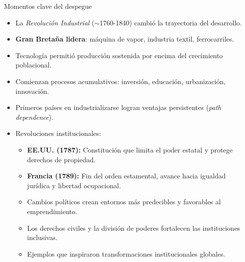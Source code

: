 \documentclass{beamer}
\begin{document}
\begin{frame}{Momentos clave del despegue}
    \small
    \begin{itemize}
        \item La \textit{Revolución Industrial} ($\sim$1760-1840) cambió la trayectoria del desarrollo.
        \item \textbf{Gran Bretaña lidera}: máquina de vapor, industria textil, ferrocarriles.
        \item Tecnología permitió producción sostenida por encima del crecimiento poblacional.
        \item Comienzan procesos acumulativos: inversión, educación, urbanización, innovación.
        \item Primeros países en industrializarse logran ventajas persistentes (\textit{path dependence}).
        \item Revoluciones institucionales:
        \begin{itemize}
            \scriptsize
            \item \textbf{EE.UU. (1787):} Constitución que limita el poder estatal y protege derechos de propiedad.
            \item \textbf{Francia (1789):} Fin del orden estamental, avance hacia igualdad jurídica y libertad ocupacional.
            \item Cambios políticos crean entornos más predecibles y favorables al emprendimiento.
            \item Los derechos civiles y la división de poderes fortalecen las instituciones inclusivas.
            \item Ejemplos que inspiraron transformaciones institucionales globales.
        \end{itemize}
    \end{itemize}
\end{frame}
\end{document}
